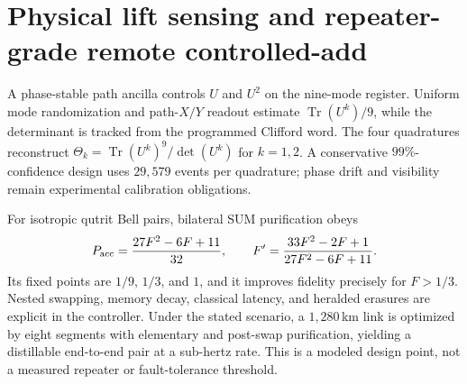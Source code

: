 \section*{Physical lift sensing and repeater-grade remote controlled-add}
A phase-stable path ancilla controls $U$ and $U^2$ on the nine-mode register.
Uniform mode randomization and path-$X/Y$ readout estimate
$\operatorname{Tr}(U^k)/9$, while the determinant is tracked from the programmed
Clifford word. The four quadratures reconstruct
$\Theta_k=\operatorname{Tr}(U^k)^9/\det(U^k)$ for $k=1,2$. A conservative
$99\%$-confidence design uses $29{,}579$ events per quadrature; phase drift and
visibility remain experimental calibration obligations.

For isotropic qutrit Bell pairs, bilateral SUM purification obeys
\[
 P_{\rm acc}=\frac{27F^2-6F+11}{32},\qquad
 F'=\frac{33F^2-2F+1}{27F^2-6F+11}.
\]
Its fixed points are $1/9$, $1/3$, and $1$, and it improves fidelity precisely
for $F>1/3$. Nested swapping, memory decay, classical latency, and heralded
erasures are explicit in the controller. Under the stated scenario, a
$1{,}280\,$km link is optimized by eight segments with elementary and post-swap
purification, yielding a distillable end-to-end pair at a sub-hertz rate. This is
a modeled design point, not a measured repeater or fault-tolerance threshold.
